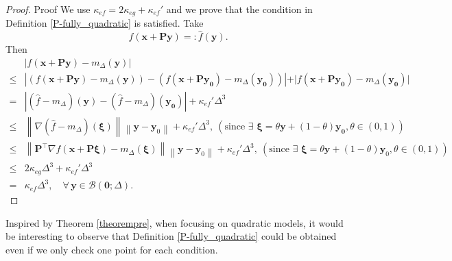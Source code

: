 \documentclass[colorlinks=true, linkcolor=blue, citecolor=blue, urlcolor=blue]{article}
\theoremstyle{plain}
\theoremstyle{definition}
\theoremstyle{remark}
\newcommand{\ul}{\boldsymbol}
\newcommand{\ml}{\boldsymbol}
\newcommand{\norm}[1]{\left\lVert#1\right\rVert}
\begin{document}
\begin{proof}{Proof}
    We use $\kappa_{ef} = 2\kappa_{eg}+\kappa_{ef}'$ and we prove that the condition in Definition \ref{P-fully_quadratic} is satisfied. 
    Take 
    \[f(\ul{x} + \ml{P}\ul{y}) =: \hat{f}(\ul{y}).\]
    Then
    \[
        \begin{aligned}
            &|f(\ul{x} + \ml{P}\ul{y})-m_{\Delta}(\ul{y})| \\ 
            \leq& |(f(\ul{x} + \ml{P}\ul{y})-m_{\Delta}(\ul{y})) - (f(\ul{x} + \ml{P}\ul{y_0})-m_{\Delta}(\ul{y_0}))|+\vert f(\ul{x} + \ml{P}\ul{y_0})-m_{\Delta}(\ul{y_0})\vert\\
            =& |(\hat{f} - m_{\Delta})(\ul{y}) - (\hat{f} - m_{\Delta})(\ul{y_0})|+\kappa_{ef}'\Delta^3\\
            \leq& \norm{\nabla (\hat{f} - m_{\Delta})( \ul{\xi})} \norm{\bm y - \bm y_0} + \kappa_{ef}'\Delta^3,  \ (\text{since \ } \exists\,  \,  \ul{\xi} = \theta \ul{y} + (1 - \theta) \ul{y_0}, \theta \in (0, 1) )\\
            \leq& \norm{\ml{P}^{\top} \nabla f(\ul{x} + \ml{P}\ul{\xi}) - m_{\Delta}( \ul{\xi})} \norm{\bm y - \bm y_0} + \kappa_{ef}'\Delta^3,  \ (\text{since \ } \exists\,  \,  \ul{\xi} = \theta \ul{y} + (1 - \theta) \ul{y}_0, \theta \in (0, 1) )\\
            \leq& 2\kappa_{e g} \Delta^3+ \kappa_{ef}' \Delta^3\\
            =& \kappa_{e f} \Delta^3, \quad \forall \,   \ul{y} \in \mathcal{B}(\ul{0};\Delta).
        \end{aligned}
    \]  
\end{proof}
    
Inspired by Theorem \ref{theorempre}, when focusing on quadratic models, it would be interesting to observe that Definition \ref{P-fully_quadratic} could be obtained even if we only check one point for each condition.
\end{document}
